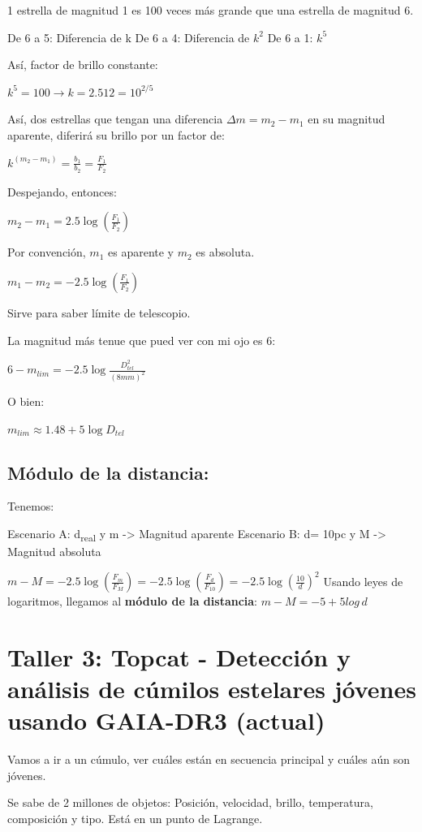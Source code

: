 \documentclass[11pt]{article}
\begin{document}
1 estrella de magnitud 1 es 100 veces más grande que una estrella de magnitud 6.

De 6 a 5: Diferencia de k
De 6 a 4: Diferencia de \(k^2\)
De 6 a 1: \(k^5\)

Así, factor de brillo constante:

\(k^5=100 \longrightarrow k= 2.512 = 10^{2/5}\)

Así, dos estrellas que tengan una diferencia \(\Delta m = m_2 - m_1\) en su magnitud aparente, diferirá su brillo por un factor de:


\(k^{(m_2-m_1)} = \frac{b_1}{b_2} = \frac{F_1}{F_2}\)

Despejando, entonces:

\(m_2-m_1 = 2.5 \log (\frac{F_1}{F_2})\)

Por convención, \(m_1\) es aparente y \(m_2\) es absoluta.

\(m_1 - m_2 = -2.5\log (\frac{F_1}{F_2})\)

Sirve para saber límite de telescopio.


La magnitud más tenue que pued ver con mi ojo es 6:

\(6-m_{lim} = -2.5 \log \frac{D_{tel}^2}{(8mm)^2}\) 

O bien:

\(m_{lim} \approx 1.48 + 5 \log{D_{tel}}\)
\subsection{Módulo de la distancia:}
\label{sec:orga33a45a}

Tenemos:

Escenario A: d\textsubscript{real} y m -> Magnitud aparente
Escenario B: d= 10pc y M -> Magnitud absoluta


\(m-M = -2.5 \log (\frac{F_m}{F_M}) = -2.5 \log (\frac{F_d}{F_{10}}) = -2.5 \log {(\frac{10}{d})}^2\)
Usando leyes de logaritmos, llegamos al \textbf{módulo de la distancia}:
\(m-M = -5 + 5log \, d\)
\section{Taller 3: Topcat - Detección y análisis de cúmilos estelares jóvenes usando GAIA-DR3 (actual)}
\label{sec:orgad36b7d}

Vamos a ir a un cúmulo, ver cuáles están en secuencia principal y cuáles aún son jóvenes.

Se sabe de 2 millones de objetos: Posición, velocidad, brillo, temperatura, composición y tipo. Está en un punto de Lagrange.
\end{document}

